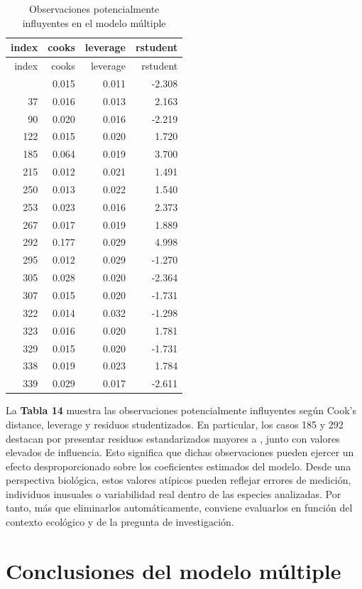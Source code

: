 \documentclass[
  spanish,
  11pt,
  a4paper,
  DIV=11,
  numbers=noendperiod]{scrartcl}
\begin{document}
\begin{longtable}[]{@{}rrrr@{}}
\caption{Observaciones potencialmente influyentes en el modelo
múltiple}\tabularnewline
\toprule\noalign{}
index & cooks & leverage & rstudent \\
\midrule\noalign{}
\endfirsthead
\toprule\noalign{}
index & cooks & leverage & rstudent \\
\midrule\noalign{}
\endhead
\bottomrule\noalign{}
\endlastfoot
14 & 0.015 & 0.011 & -2.308 \\
37 & 0.016 & 0.013 & 2.163 \\
90 & 0.020 & 0.016 & -2.219 \\
122 & 0.015 & 0.020 & 1.720 \\
185 & 0.064 & 0.019 & 3.700 \\
215 & 0.012 & 0.021 & 1.491 \\
250 & 0.013 & 0.022 & 1.540 \\
253 & 0.023 & 0.016 & 2.373 \\
267 & 0.017 & 0.019 & 1.889 \\
292 & 0.177 & 0.029 & 4.998 \\
295 & 0.012 & 0.029 & -1.270 \\
305 & 0.028 & 0.020 & -2.364 \\
307 & 0.015 & 0.020 & -1.731 \\
322 & 0.014 & 0.032 & -1.298 \\
323 & 0.016 & 0.020 & 1.781 \\
329 & 0.015 & 0.020 & -1.731 \\
338 & 0.019 & 0.023 & 1.784 \\
339 & 0.029 & 0.017 & -2.611 \\
\end{longtable}

La \textbf{Tabla 14} muestra las observaciones potencialmente
influyentes según Cook's distance, leverage y residuos studentizados. En
particular, los casos 185 y 292 destacan por presentar residuos
estandarizados mayores a \textbar, junto con valores elevados
de influencia. Esto significa que dichas observaciones pueden ejercer un
efecto desproporcionado sobre los coeficientes estimados del modelo.
Desde una perspectiva biológica, estos valores atípicos pueden reflejar
errores de medición, individuos inusuales o variabilidad real dentro de
las especies analizadas. Por tanto, más que eliminarlos automáticamente,
conviene evaluarlos en función del contexto ecológico y de la pregunta
de investigación.

\section{Conclusiones del modelo
múltiple}\label{conclusiones-del-modelo-muxfaltiple}
\end{document}
